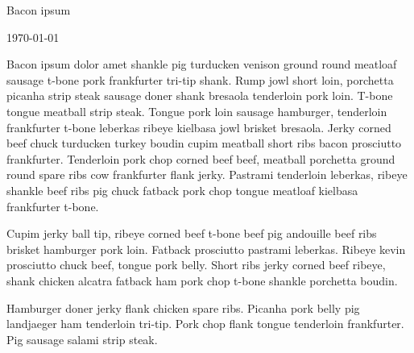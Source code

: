 \documentclass[openany,letterpaper,11pt]{report}
\begin{document}
\thispagestyle{empty}

\begin{center}
\LARGE{Bacon ipsum}
\end{center}

\begin{center}
\today
\end{center}

\vspace{2.5cm}


Bacon ipsum dolor amet shankle pig turducken venison ground round meatloaf sausage t-bone pork frankfurter tri-tip shank. Rump jowl short loin, porchetta picanha strip steak sausage doner shank bresaola tenderloin pork loin. T-bone tongue meatball strip steak. Tongue pork loin sausage hamburger, tenderloin frankfurter t-bone leberkas ribeye kielbasa jowl brisket bresaola. Jerky corned beef chuck turducken turkey boudin cupim meatball short ribs bacon prosciutto frankfurter. Tenderloin pork chop corned beef beef, meatball porchetta ground round spare ribs cow frankfurter flank jerky. Pastrami tenderloin leberkas, ribeye shankle beef ribs pig chuck fatback pork chop tongue meatloaf kielbasa frankfurter t-bone.\newline

Cupim jerky ball tip, ribeye corned beef t-bone beef pig andouille beef ribs brisket hamburger pork loin. Fatback prosciutto pastrami leberkas. Ribeye kevin prosciutto chuck beef, tongue pork belly. Short ribs jerky corned beef ribeye, shank chicken alcatra fatback ham pork chop t-bone shankle porchetta boudin.\newline

Hamburger doner jerky flank chicken spare ribs. Picanha pork belly pig landjaeger ham tenderloin tri-tip. Pork chop flank tongue tenderloin frankfurter. Pig sausage salami strip steak.\newline

\newpage

\setcounter{page}{2}
\end{document}
